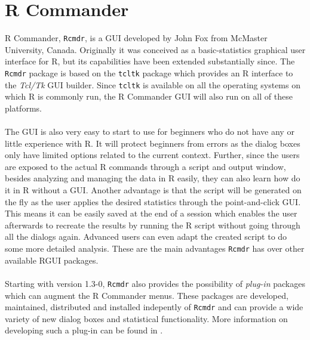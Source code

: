 \documentclass[a4paper]{article}\usepackage[]{graphicx}\usepackage[]{color}
\begin{document}
\section{R Commander}

R Commander, \verb|Rcmdr|\citep{Fox2005}, is a GUI developed by John Fox from
McMaster University, Canada. Originally it was conceived as a basic-statistics graphical
user interface for R, but its capabilities have been extended substantially
since. The \verb|Rcmdr| package is based on the \verb|tcltk| package
\citep{Dalgaard2001} which provides an R interface to the {\it Tcl/Tk} GUI builder. 
Since \verb|tcltk| is available on all the operating systems on which R is
commonly run, the R Commander GUI will also run on all of these platforms.\\ \\
The GUI is also very easy to start to use for beginners who do not have any
or little experience with R. It will protect beginners from errors as the dialog
boxes only have limited options related to the current context. Further, since
the users are exposed to the actual R commands through a script and output
window, besides analyzing and managing the data in R easily, they can also
learn how do it in R without a GUI.
Another advantage is that the script will be generated on the fly as the user
applies the desired statistics through the point-and-click GUI. This means it can be easily
saved at the end of a session which enables the user afterwards to recreate the
results by running the R script without going through all the dialogs again.
Advanced users can even adapt the created script to do some more detailed
analysis. These are the main advantages \verb|Rcmdr| has over other available
RGUI packages.\\ \\
Starting with version 1.3-0, \verb|Rcmdr| also provides the possibility of {\it
plug-in} packages which can augment the R Commander menus. These packages are
developed, maintained, distributed and installed indepently of \verb|Rcmdr| and
can provide a wide variety of new dialog boxes and statistical functionality.
More information on developing such a plug-in can be found in \citet{Fox2007}.\\
\end{document}
